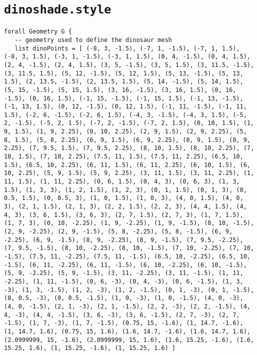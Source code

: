 \chapter{\texttt{dinoshade.style}}

\begin{lstlisting}[language=Sty-RT,escapechar=@]
forall Geometry G {
   -- geometry used to define the dinosaur mesh
   list dinoPoints = [ (-8, 3, -1.5), (-7, 1, -1.5), (-7, 1, 1.5), (-8, 3, 1.5), (-3, 1, -1.5), (-3, 1, 1.5), (0, 4, -1.5), (0, 4, 1.5), (2, 4, -1.5), (2, 4, 1.5), (3, 5, -1.5), (3, 5, 1.5), (3, 11.5, -1.5), (3, 11.5, 1.5), (5, 12, -1.5), (5, 12, 1.5), (5, 13, -1.5), (5, 13, 1.5), (2, 13.5, -1.5), (2, 13.5, 1.5), (5, 14, -1.5), (5, 14, 1.5), (5, 15, -1.5), (5, 15, 1.5), (3, 16, -1.5), (3, 16, 1.5), (0, 16, -1.5), (0, 16, 1.5), (-1, 15, -1.5), (-1, 15, 1.5), (-1, 13, -1.5), (-1, 13, 1.5), (0, 12, -1.5), (0, 12, 1.5), (-1, 11, -1.5), (-1, 11, 1.5), (-2, 6, -1.5), (-2, 6, 1.5), (-4, 3, -1.5), (-4, 3, 1.5), (-5, 2, -1.5), (-5, 2, 1.5), (-7, 2, -1.5), (-7, 2, 1.5), (0, 10, 1.5), (1, 9, 1.5), (1, 9, 2.25), (0, 10, 2.25), (2, 9, 1.5), (2, 9, 2.25), (5, 8, 1.5), (5, 8, 2.25), (6, 9, 1.5), (6, 9, 2.25), (8, 9, 1.5), (8, 9, 2.25), (7, 9.5, 1.5), (7, 9.5, 2.25), (8, 10, 1.5), (8, 10, 2.25), (7, 10, 1.5), (7, 10, 2.25), (7.5, 11, 1.5), (7.5, 11, 2.25), (6.5, 10, 1.5), (6.5, 10, 2.25), (6, 11, 1.5), (6, 11, 2.25), (6, 10, 1.5), (6, 10, 2.25), (5, 9, 1.5), (5, 9, 2.25), (3, 11, 1.5), (3, 11, 2.25), (1, 11, 1.5), (1, 11, 2.25), (0, 6, 1.5), (0, 4, 3), (0, 6, 3), (1, 3, 1.5), (1, 3, 3), (1, 2, 1.5), (1, 2, 3), (0, 1, 1.5), (0, 1, 3), (0, 0.5, 1.5), (0, 0.5, 3), (1, 0, 1.5), (1, 0, 3), (4, 0, 1.5), (4, 0, 3), (2, 1, 1.5), (2, 1, 3), (2, 2, 1.5), (2, 2, 3), (4, 4, 1.5), (4, 4, 3), (3, 6, 1.5), (3, 6, 3), (2, 7, 1.5), (2, 7, 3), (1, 7, 1.5), (1, 7, 3), (0, 10, -2.25), (1, 9, -2.25), (1, 9, -1.5), (0, 10, -1.5), (2, 9, -2.25), (2, 9, -1.5), (5, 8, -2.25), (5, 8, -1.5), (6, 9, -2.25), (6, 9, -1.5), (8, 9, -2.25), (8, 9, -1.5), (7, 9.5, -2.25), (7, 9.5, -1.5), (8, 10, -2.25), (8, 10, -1.5), (7, 10, -2.25), (7, 10, -1.5), (7.5, 11, -2.25), (7.5, 11, -1.5), (6.5, 10, -2.25), (6.5, 10, -1.5), (6, 11, -2.25), (6, 11, -1.5), (6, 10, -2.25), (6, 10, -1.5), (5, 9, -2.25), (5, 9, -1.5), (3, 11, -2.25), (3, 11, -1.5), (1, 11, -2.25), (1, 11, -1.5), (0, 6, -3), (0, 4, -3), (0, 6, -1.5), (1, 3, -3), (1, 3, -1.5), (1, 2, -3), (1, 2, -1.5), (0, 1, -3), (0, 1, -1.5), (0, 0.5, -3), (0, 0.5, -1.5), (1, 0, -3), (1, 0, -1.5), (4, 0, -3), (4, 0, -1.5), (2, 1, -3), (2, 1, -1.5), (2, 2, -3), (2, 2, -1.5), (4, 4, -3), (4, 4, -1.5), (3, 6, -3), (3, 6, -1.5), (2, 7, -3), (2, 7, -1.5), (1, 7, -3), (1, 7, -1.5), (0.75, 15, -1.6), (1, 14.7, -1.6), (1, 14.7, 1.6), (0.75, 15, 1.6), (1.6, 14.7, -1.6), (1.6, 14.7, 1.6), (2.0999999, 15, -1.6), (2.0999999, 15, 1.6), (1.6, 15.25, -1.6), (1.6, 15.25, 1.6), (1, 15.25, -1.6), (1, 15.25, 1.6) ]

\end{lstlisting}
